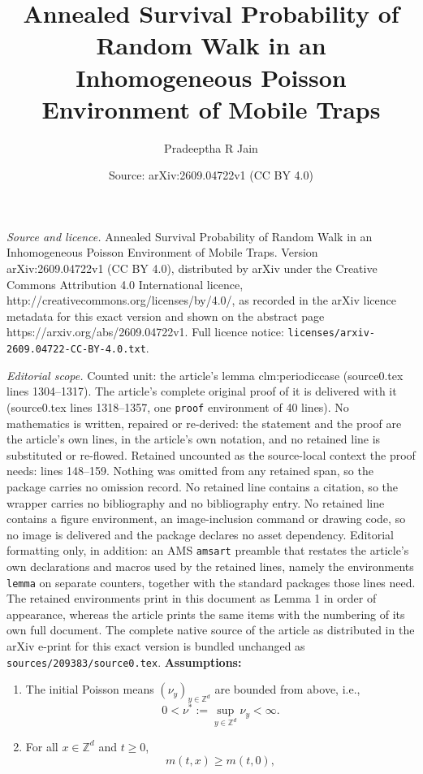\documentclass[10pt,a4paper]{amsart}
\title{Annealed Survival Probability of Random Walk in an Inhomogeneous Poisson Environment of Mobile Traps}
\author{Pradeeptha R Jain}
\date{Source: arXiv:2609.04722v1 (CC BY 4.0)}
\newcommand{\Z}{\mathbb{Z}}
\begin{document}
\maketitle

\noindent\emph{Source and licence.} Annealed Survival Probability of Random Walk in an Inhomogeneous Poisson Environment of Mobile Traps. Version arXiv:2609.04722v1 (CC BY 4.0), distributed by arXiv under the Creative Commons Attribution 4.0 International licence, http://creativecommons.org/licenses/by/4.0/, as recorded in the arXiv licence metadata for this exact version and shown on the abstract page https://arxiv.org/abs/2609.04722v1. Full licence notice: \texttt{licenses/arxiv-2609.04722-CC-BY-4.0.txt}.\par\smallskip

\noindent\textit{Editorial scope.} Counted unit: the article's lemma clm:periodiccase (source0.tex lines 1304--1317). The article's complete original proof of it is delivered with it (source0.tex lines 1318--1357, one \texttt{proof} environment of 40 lines). No mathematics is written, repaired or re-derived: the statement and the proof are the article's own lines, in the article's own notation, and no retained line is substituted or re-flowed.  Retained uncounted as the source-local context the proof needs: lines 148--159.  Nothing was omitted from any retained span, so the package carries no omission record.  No retained line contains a citation, so the wrapper carries no bibliography and no bibliography entry.  No retained line contains a figure environment, an image-inclusion command or drawing code, so no image is delivered and the package declares no asset dependency.  Editorial formatting only, in addition: an AMS \texttt{amsart} preamble that restates the article's own declarations and macros used by the retained lines, namely the environments \texttt{lemma} on separate counters, together with the standard packages those lines need.  The retained environments print in this document as Lemma 1 in order of appearance, whereas the article prints the same items with the numbering of its own full document.  The complete native source of the article as distributed in the arXiv e-print for this exact version is bundled unchanged as \texttt{sources/209383/source0.tex}.
\noindent \textbf{Assumptions:}
\begin{enumerate}[label=(A\arabic*)]
    \item \label{list:A1}The initial Poisson means $(\nu_y)_{y\in \mathbb{Z}^d}$ are bounded from above, i.e.,
$$
0< \nu^* := \sup_{y\in \mathbb{Z}^d} \nu_y < \infty.
$$
\item \label{list:A2} For all $x\in \Z^d$ and $t\ge 0$,
  \begin{equation}
      m(t,x)\ge m(t,0),
      \label{eqn:pascalcond} 
  \end{equation}
\end{enumerate}
\end{document}
